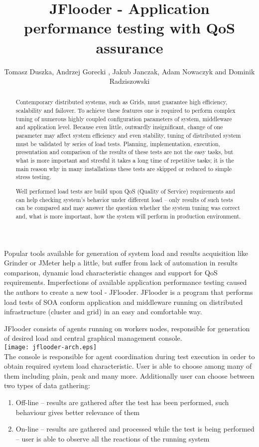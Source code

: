 \documentclass{article}
\title{JFlooder - Application performance testing with QoS assurance}
\author{Tomasz Duszka\inst{1}, 
		Andrzej Gorecki\inst{1} , 
		Jakub Janczak\inst{1}, 
		Adam Nowaczyk\inst{1} 
		and Dominik Radziszowski\inst{1}
}
\institute{Institute of Computer Science, AGH UST, al. Mickiewicza 30, 30-059 Krakow, Poland}
\begin{document}
\maketitle

\begin{abstract}
Contemporary distributed systems, such as Grids, must guarantee high efficiency, scalability and failover.
To achieve these features one is required to perform complex tuning of numerous highly coupled configuration parameters of system, middleware and application level. 
Because even little, outwardly insignificant, change of one parameter may affect system efficiency and even stability, tuning of distributed system must be validated by series of load tests. 
Planning, implementation, execution, presentation and comparison of the results of these tests are not the easy tasks, but what is more important and stresful it takes a long time of repetitive tasks; it is the main reason why in many installations these tests are skipped or reduced to simple stress testing. 


Well performed load tests are build upon QoS (Quality of Service) requirements and can help checking system's behavior under different load – only results of such tests can be compared and may answer the question whether the system tuning was correct and, what is more important, how the system will perform in production environment. 
\end{abstract}

Popular tools available for generation of system load and results acquisition like Grinder or JMeter help a little, but suffer from lack of automation in results comparison, dynamic load characteristic changes and support for QoS requirements. 
Imperfections of available application performance testing caused the authors to create a new tool - JFlooder. 
JFlooder is a program that performs load tests of SOA conform application and middleware running on distributed infrastructure (cluster and grid) in an easy and comfortable way. 

JFlooder consists of agents running on workers nodes, responsible for generation of desired load and central graphical management console. 
\\
\texttt{[image: jflooder-arch.eps]}
\\
The console is responsible for agent coordination during test execution in order to obtain required system load characteristic. User is able to choose among many of them including plain, peak and many more. Additionally user can choose between two types of data gathering:
\begin{enumerate}

\item{Off-line – results are gathered after the test has been performed, such behaviour gives better relevance of them}

\item{On-line – results are gathered and processed while the test is being performed – user is able to observe all the reactions of the running system}

\end{enumerate}
\end{document}
